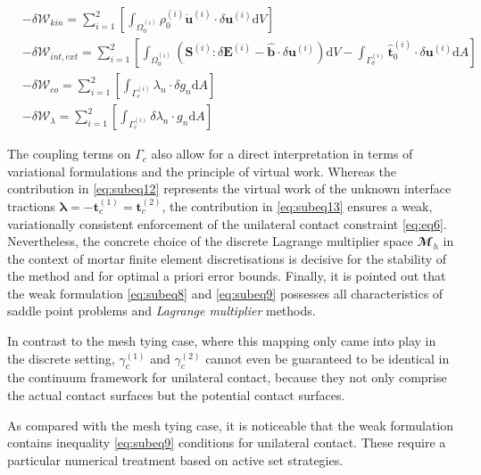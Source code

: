 \documentclass[a4paper,10pt]{article} %
\begin{document}
\begin{subequations}\label{eq:constributions}
    \begin{align}
        & -\delta \mathcal{W}_{kin} = \sum_{i = 1}^2 \left[\int_{\Omega_0^{(i)}} \rho_0^{(i)} \ddot{\mathbf{u}}^{(i)} \cdot \delta \mathbf{u}^{(i)} \text{d}V\right] \label{eq:subeq10} \\
        & -\delta \mathcal{W}_{int,ext} = \sum_{i = 1}^2 \left[\int_{\Omega_0^{(i)}} \left(\mathbf{S}^{(i)} : \delta \mathbf{E}^{(i)} - \hat{\mathbf{b}}\cdot \delta\mathbf{u}^{(i)} \right) \text{d}V - \int_{\Gamma_\sigma^{(i)}} \hat{\mathbf{t}}_0^{(i)}\cdot\delta\mathbf{u}^{(i)} \text{d}A \right] \label{eq:subeq11} \\
        & -\delta \mathcal{W}_{co} = \sum_{i = 1}^2 \left[\int_{\Gamma_c^{(i)}} \lambda_n \cdot \delta g_n \text{d}A\right] \label{eq:subeq12} \\ 
        & -\delta \mathcal{W}_{\lambda} = \sum_{i = 1}^2 \left[\int_{\Gamma_c^{(i)}} \delta \lambda_n \cdot g_n \text{d}A\right] \label{eq:subeq13}
    \end{align}
\end{subequations}

The coupling terms on $\Gamma_c$ also allow for a direct interpretation in terms of variational formulations and the principle of virtual work. Whereas the contribution in \eqref{eq:subeq12} represents the virtual work of the unknown interface tractions $\boldsymbol{\lambda} = −\mathbf{t}_c^{(1)} = \mathbf{t}_c^{(2)}$, the contribution in \eqref{eq:subeq13} ensures a weak, variationally consistent enforcement of the unilateral contact constraint \eqref{eq:eq6}. Nevertheless, the concrete choice of the discrete Lagrange multiplier space $\mathbfcal{M}_h$ in the context of mortar finite element discretisations is decisive for the stability of the method and for optimal a priori error bounds. Finally, it is pointed out that the weak formulation \eqref{eq:subeq8} and \eqref{eq:subeq9} possesses all characteristics of saddle point problems and \textit{Lagrange multiplier} methods.

In contrast to the mesh tying case, where this mapping only came into play in the discrete setting, $\gamma_c^{(1)}$ and $\gamma_c^{(2)}$ cannot even be guaranteed to be identical in the continuum framework for unilateral contact, because they not only comprise the actual contact surfaces but the potential contact surfaces. 

As compared with the mesh tying case, it is noticeable that the weak formulation contains inequality \eqref{eq:subeq9} conditions for unilateral contact. These require a particular numerical treatment based on active set strategies.
\end{document}
